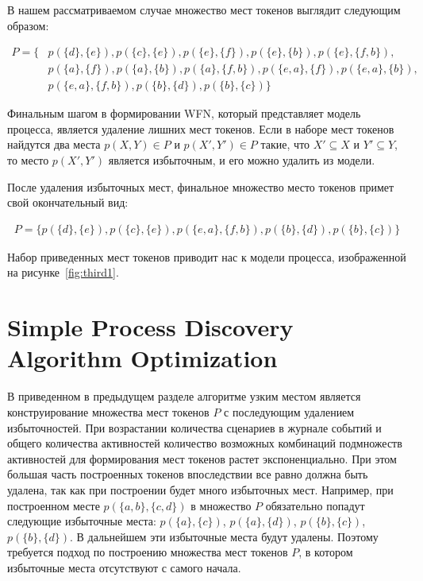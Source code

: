 \documentclass[
11pt,%
tightenlines,%
twoside,%
onecolumn,%
nofloats,%
nobibnotes,%
nofootinbib,%
superscriptaddress,%
noshowpacs,%
centertags]%
{revtex4}
\begin{document}
В нашем рассматриваемом случае множество мест токенов выглядит следующим образом:

\begin{equation}
\begin{aligned}
P = \{
& p(\{d\}, \{e\}),
p(\{c\}, \{e\}),
p(\{e\}, \{f\}),
p(\{e\}, \{b\}),
p(\{e\}, \{f, b\}), \\
& p(\{a\}, \{f\}),
p(\{a\}, \{b\}),
p(\{a\}, \{f, b\}),
p(\{e, a\}, \{f\}),
p(\{e, a\}, \{b\}), \\
& p(\{e, a\}, \{f, b\}),
p(\{b\}, \{d\}),
p(\{b\}, \{c\})
\}
\end{aligned}
\end{equation}

Финальным шагом в формировании WFN, который представляет модель процесса, является удаление лишних мест токенов.
Если в наборе мест токенов найдутся два места $p(X, Y) \in P$ и $p(X', Y') \in P$ такие, что $X' \subseteq X$ и $Y' \subseteq Y$, то место $p(X', Y')$ является избыточным, и его можно удалить из модели.

После удаления избыточных мест, финальное множество место токенов примет свой окончательный вид:

\begin{equation}
\begin{aligned}
P = \{
p(\{d\}, \{e\}), p(\{c\}, \{e\}), p(\{e, a\}, \{f, b\}), p(\{b\}, \{d\}), p(\{b\}, \{c\})
\}
\end{aligned}
\end{equation}

Набор приведенных мест токенов приводит нас к модели процесса, изображенной на рисунке~\ref{fig:third1}.

\section{Simple Process Discovery Algorithm Optimization}

В приведенном в предыдущем разделе алгоритме узким местом является конструирование множества мест токенов $P$ с последующим удалением избыточностей.
При возрастании количества сценариев в журнале событий и общего количества активностей количество возможных комбинаций подмножеств активностей для формирования мест токенов растет экспоненциально.
При этом большая часть построенных токенов впоследствии все равно должна быть удалена, так как при построении будет много избыточных мест.
Например, при построенном месте $p(\{a, b\}, \{c, d\})$ в множество $P$ обязательно попадут следующие избыточные места: $p(\{a\}, \{c\})$, $p(\{a\}, \{d\})$, $p(\{b\}, \{c\})$, $p(\{b\}, \{d\})$.
В дальнейшем эти избыточные места будут удалены.
Поэтому требуется подход по построению множества мест токенов $P$, в котором избыточные места отсутствуют с самого начала.
\end{document}
